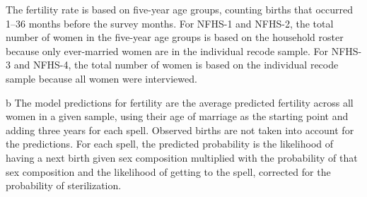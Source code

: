 \begin{table}[hp!]
\begin{center}
\begin{footnotesize}
\begin{threeparttable}
\begin{tablenotes}
The fertility rate is based on five-year age groups, counting births that 
occurred 1--36 months before the survey months.
For NFHS-1 and NFHS-2, the total number of women in the five-year age
groups is based on the household roster because only ever-married women
are in the individual recode sample.
For NFHS-3 and NFHS-4, the total number of women is based on the individual
recode sample because all women were interviewed.
\item[b] 
The model predictions for fertility are the average predicted fertility
across all women in a given sample, using their age of marriage as the
starting point and adding three years for each spell.
Observed births are not taken into account for the predictions.
For each spell, the predicted probability is the likelihood of having a
next birth given sex composition multiplied with the probability of that
sex composition and the likelihood of getting to the spell,
corrected for the probability of sterilization.
\end{tablenotes}
\end{threeparttable}
\end{footnotesize}
\end{center}
\end{table}
